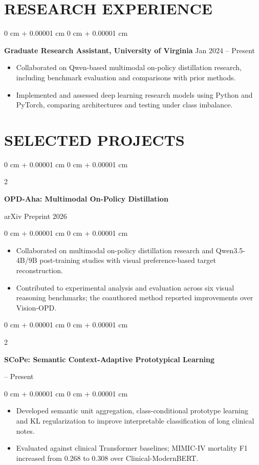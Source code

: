 \documentclass[10pt, letterpaper]{article}
\newenvironment{highlights}{
    \begin{itemize}[
        topsep=0.03 cm,
        parsep=0.03 cm,
        partopsep=0pt,
        itemsep=0pt,
        leftmargin=0 cm + 10pt
    ]
}{
    \end{itemize}
} %
\newenvironment{onecolentry}{
    \begin{adjustwidth}{
        0 cm + 0.00001 cm
    }{
        0 cm + 0.00001 cm
    }
}{
    \end{adjustwidth}
} %
\newenvironment{twocolentry}[2][]{
    \onecolentry
    \def\secondColumn{#2}
    \setcolumnwidth{\fill, 4.5 cm}
    \begin{paracol}{2}
}{
    \switchcolumn \raggedleft \secondColumn
    \end{paracol}
    \endonecolentry
} %
\begin{document}
\section{RESEARCH EXPERIENCE}
\begin{onecolentry}
\textbf{Graduate Research Assistant, University of Virginia} \hfill Jan 2024 -- Present
\begin{highlights}
\item Collaborated on Qwen-based multimodal on-policy distillation research, including benchmark evaluation and comparisons with prior methods.
\item Implemented and assessed deep learning research models using Python and PyTorch, comparing architectures and testing under class imbalance.
\end{highlights}
\end{onecolentry}
\section{SELECTED PROJECTS}
\begin{twocolentry}{arXiv Preprint 2026}
\textbf{OPD-Aha: Multimodal On-Policy Distillation}
\end{twocolentry}
\begin{onecolentry}
\begin{highlights}
\item Collaborated on multimodal on-policy distillation research and Qwen3.5-4B/9B post-training studies with visual preference-based target reconstruction.
\item Contributed to experimental analysis and evaluation across six visual reasoning benchmarks; the coauthored method reported improvements over Vision-OPD.
\end{highlights}
\end{onecolentry}
\vspace{0.035 cm}

\begin{twocolentry}{2026 -- Present}
\textbf{SCoPe: Semantic Context-Adaptive Prototypical Learning}
\end{twocolentry}
\begin{onecolentry}
\begin{highlights}
\item Developed semantic unit aggregation, class-conditional prototype learning and KL regularization to improve interpretable classification of long clinical notes.
\item Evaluated against clinical Transformer baselines; MIMIC-IV mortality F1 increased from 0.268 to 0.308 over Clinical-ModernBERT.
\end{highlights}
\end{onecolentry}
\vspace{0.035 cm}
\end{document}
